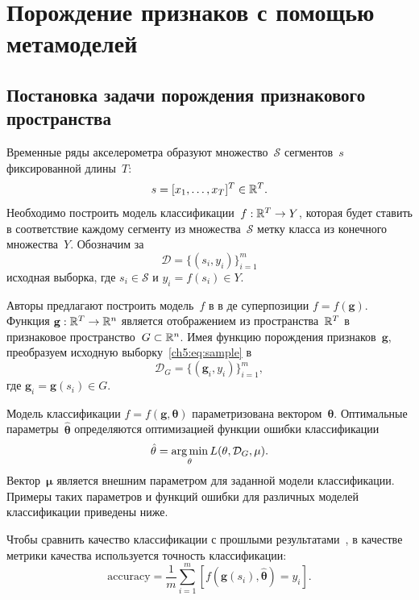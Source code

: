\chapter{Порождение признаков с помощью метамоделей}
\label{chapter6}

\section{Постановка задачи порождения признакового пространства}
Временные ряды акселерометра образуют множество~$\mathcal{S}$ сегментов~$s$ фиксированной длины~$T$:
\begin{equation}
s = [x_1, \dots, x_T]^{T} \in \mathbb{R}^T.
\label{ch5:eq:time_series}
\end{equation}
Необходимо построить модель классификации~$f: \mathbb{R}^T \rightarrow Y$, которая будет ставить в соответствие каждому сегменту из множества~$\mathcal{S}$ метку класса из конечного множества~$Y$.
Обозначим за
\begin{equation}
	\mathcal{D} = \{(s_i, y_i)\}_{i=1}^m
	\label{ch5:eq:sample}
\end{equation}
исходная выборка, где $s_i \in \mathcal{S}$ и $y_i = f(s_i)\in Y$.

Авторы предлагают построить модель~$f$ в в де суперпозиции $f=f(\mathbf{g})$.
Функция $\mathbf{g}: \mathbb{R}^T \rightarrow \mathbb{R}^n$ является отображением из пространства~$\mathbb{R}^{T} $ в признаковое пространство~$G \subset \mathbb{R}^n$.
Имея функцию порождения признаков~$\mathbf{g}$, преобразуем исходную выборку~\eqref{ch5:eq:sample} в
\[
	\mathcal{D}_G = \{(\mathbf{g}_i, y_i)\}_{i=1}^m,
\]
где $\mathbf{g}_i = \mathbf{g}(s_i) \in G$. 

Модель классификации $f=f(\mathbf{g}, \mathbf{\theta})$ параметризована вектором~$\boldsymbol{\theta}$. 
Оптимальные параметры~$\hat{\mathbf{\theta}}$ определяются оптимизацией функции ошибки классификации
\begin{equation}
\hat{\mathbf{\theta}} = \mathop{\arg \min}\limits_{\mathbf{\theta}} L(\mathbf{\theta}, \mathcal{D}_G, \mathbf{\mu}).
\label{ch5:eq:optimal_classification_params}
\end{equation}
Вектор~$\mathbf{\mu}$ является внешним параметром для заданной модели классификации. 
Примеры таких параметров и функций ошибки для различных моделей классификации приведены ниже.

Чтобы сравнить качество классификации с прошлыми результатами~\cite{karasikov2016feature,ivkin2015ts}, в качестве метрики качества используется точность классификации:
\begin{equation}
	\mathrm{accuracy} = \frac{1}{m} \sum_{i=1}^{m} \left[f\left(\mathbf{g}(s_i), \hat{\mathbf{\theta}} \right)= y_i\right].
	\label{ch5:eq:accuracy}
\end{equation}

